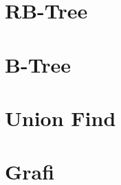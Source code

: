 \documentclass[12pt,a4paper]{report}
\begin{document}
 

\maketitle
\tableofcontents
 
\chapter{RB-Tree}
\chapter{B-Tree}
\chapter{Union Find}
\chapter{Grafi}





\end{document}
